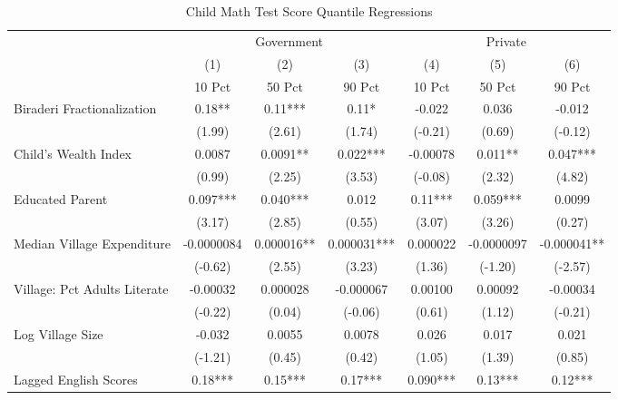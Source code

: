 \begin{sidewaystable}[htbp]\centering
\def\sym#1{\ifmmode^{#1}\else\(^{#1}\)\fi}
\caption{Child Math Test Score Quantile Regressions\label{kidsquantsmath}}
\begin{tabular}{l*{6}{c}}
\toprule
                &\multicolumn{3}{c}{Government}        &\multicolumn{3}{c}{Private}           \\\cmidrule(lr){2-4}\cmidrule(lr){5-7}
                &\multicolumn{1}{c}{(1)}&\multicolumn{1}{c}{(2)}&\multicolumn{1}{c}{(3)}&\multicolumn{1}{c}{(4)}&\multicolumn{1}{c}{(5)}&\multicolumn{1}{c}{(6)}\\
                &\multicolumn{1}{c}{10 Pct}&\multicolumn{1}{c}{50 Pct}&\multicolumn{1}{c}{90 Pct}&\multicolumn{1}{c}{10 Pct}&\multicolumn{1}{c}{50 Pct}&\multicolumn{1}{c}{90 Pct}\\
\midrule
Biraderi Fractionalization&     0.18** &     0.11***&     0.11*  &   -0.022   &    0.036   &   -0.012   \\
                &   (1.99)   &   (2.61)   &   (1.74)   &  (-0.21)   &   (0.69)   &  (-0.12)   \\
Child's Wealth Index&   0.0087   &   0.0091** &    0.022***& -0.00078   &    0.011** &    0.047***\\
                &   (0.99)   &   (2.25)   &   (3.53)   &  (-0.08)   &   (2.32)   &   (4.82)   \\
Educated Parent &    0.097***&    0.040***&    0.012   &     0.11***&    0.059***&   0.0099   \\
                &   (3.17)   &   (2.85)   &   (0.55)   &   (3.07)   &   (3.26)   &   (0.27)   \\
Median Village Expenditure&-0.0000084   & 0.000016** & 0.000031***& 0.000022   &-0.0000097   &-0.000041** \\
                &  (-0.62)   &   (2.55)   &   (3.23)   &   (1.36)   &  (-1.20)   &  (-2.57)   \\
Village: Pct Adults Literate& -0.00032   & 0.000028   &-0.000067   &  0.00100   &  0.00092   & -0.00034   \\
                &  (-0.22)   &   (0.04)   &  (-0.06)   &   (0.61)   &   (1.12)   &  (-0.21)   \\
Log Village Size&   -0.032   &   0.0055   &   0.0078   &    0.026   &    0.017   &    0.021   \\
                &  (-1.21)   &   (0.45)   &   (0.42)   &   (1.05)   &   (1.39)   &   (0.85)   \\
Lagged English Scores&     0.18***&     0.15***&     0.17***&    0.090***&     0.13***&     0.12***\\

\end{tabular}
\end{sidewaystable}
